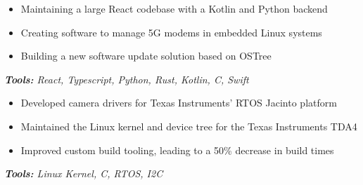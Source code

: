 \documentclass[10pt,letter]{altacv}
\begin{document}

\begin{fullwidth}
\marginpar{\makesidebarheader}
    \vspace*{-1\baselineskip}
\makecvheader
\end{fullwidth}

\vspace{6pt}


\begin{itemize}
  \item Maintaining a large React codebase with a Kotlin and Python backend
  \item Creating software to manage 5G modems in embedded Linux systems
  \item Building a new software update solution based on OSTree
\end{itemize}
\textit{\textbf{Tools:} React, Typescript, Python, Rust, Kotlin, C, Swift}

\divider

\begin{itemize}
  \item Developed camera drivers for Texas Instruments' RTOS Jacinto platform
  \item Maintained the Linux kernel and device tree for the Texas Instruments TDA4
  \item Improved custom build tooling, leading to a 50\% decrease in build times
\end{itemize}
\textit{\textbf{Tools:} Linux Kernel, C, RTOS, I2C}
\end{document}
